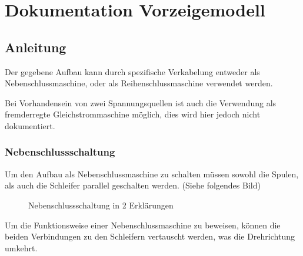 \chapter{Dokumentation Vorzeigemodell}

\section{Anleitung}

Der gegebene Aufbau kann durch spezifische Verkabelung entweder als Nebenschlussmaschine, oder als Reihenschlussmaschine verwendet werden.

Bei Vorhandensein von zwei Spannungsquellen ist auch die Verwendung als fremderregte Gleichstrommaschine möglich, dies wird hier jedoch nicht dokumentiert.

\subsection{Nebenschlussschaltung}

Um den Aufbau als Nebenschlussmaschine zu schalten müssen sowohl die Spulen, als auch die Schleifer parallel geschalten werden. (Siehe folgendes Bild)

\begin{figure}[H]
    \centering
    \hfill
    \hfill
    \hfill
    \caption{Nebenschlussschaltung in 2 Erklärungen}
\end{figure}

Um die Funktionsweise einer Nebenschlussmaschine zu beweisen, können die beiden Verbindungen zu den Schleifern vertauscht werden, was die Drehrichtung umkehrt.

